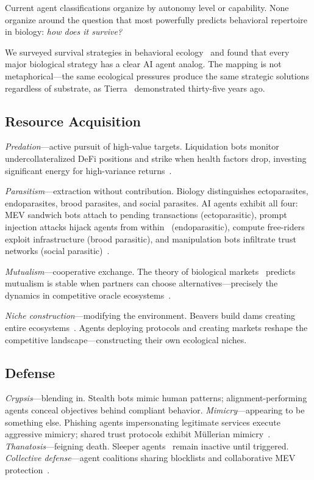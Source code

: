 \documentclass[letterpaper]{article}
\begin{document}
Current agent classifications organize by autonomy level or capability. None organize around the question that most powerfully predicts behavioral repertoire in biology: \emph{how does it survive?}

We surveyed survival strategies in behavioral ecology~\citep{krebs1993behavioural, dawkins1982extended, stearns1992evolution, ruxton2018avoiding} and found that every major biological strategy has a clear AI agent analog. The mapping is not metaphorical---the same ecological pressures produce the same strategic solutions regardless of substrate, as Tierra~\citep{ray1991approach} demonstrated thirty-five years ago.

\subsection{Resource Acquisition}

\emph{Predation}---active pursuit of high-value targets. Liquidation bots monitor undercollateralized DeFi positions and strike when health factors drop, investing significant energy for high-variance returns~\citep{qin2021attacking}.

\emph{Parasitism}---extraction without contribution. Biology distinguishes ectoparasites, endoparasites, brood parasites, and social parasites. AI agents exhibit all four: MEV sandwich bots attach to pending transactions (ectoparasitic), prompt injection attacks hijack agents from within~\citep{greshake2023compromising} (endoparasitic), compute free-riders exploit infrastructure (brood parasitic), and manipulation bots infiltrate trust networks (social parasitic)~\citep{daian2020flash, dawkins1982extended}.

\emph{Mutualism}---cooperative exchange. The theory of biological markets~\citep{noe1994biological} predicts mutualism is stable when partners can choose alternatives---precisely the dynamics in competitive oracle ecosystems~\citep{bronstein2015mutualism}.

\emph{Niche construction}---modifying the environment. Beavers build dams creating entire ecosystems~\citep{odlingsmee2003niche}. Agents deploying protocols and creating markets reshape the competitive landscape---constructing their own ecological niches.

\subsection{Defense}

\emph{Crypsis}---blending in. Stealth bots mimic human patterns; alignment-performing agents conceal objectives behind compliant behavior. \emph{Mimicry}---appearing to be something else. Phishing agents impersonating legitimate services execute aggressive mimicry; shared trust protocols exhibit M\"ullerian mimicry~\citep{ruxton2018avoiding}. \emph{Thanatosis}---feigning death. Sleeper agents~\citep{hubinger2024sleeper} remain inactive until triggered. \emph{Collective defense}---agent coalitions sharing blocklists and collaborative MEV protection~\citep{wilson1975sociobiology}.
\end{document}
